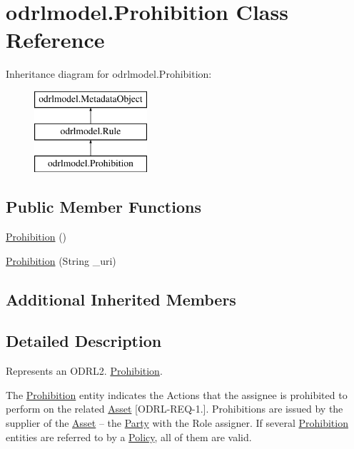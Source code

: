 \hypertarget{classodrlmodel_1_1_prohibition}{\section{odrlmodel.\-Prohibition Class Reference}
\label{classodrlmodel_1_1_prohibition}
}
Inheritance diagram for odrlmodel.\-Prohibition\-:\begin{figure}[H]
\begin{center}
\leavevmode
\includegraphics[height=3.000000cm]{classodrlmodel_1_1_prohibition}
\end{center}
\end{figure}
\subsection*{Public Member Functions}
\begin{DoxyCompactItemize}
\item 
\hyperlink{classodrlmodel_1_1_prohibition_a444002a7ca9513c35688bac18f176b0a}{Prohibition} ()
\item 
\hyperlink{classodrlmodel_1_1_prohibition_aa76b9833e97cd020ef8bf27469b39da6}{Prohibition} (String \-\_\-uri)
\end{DoxyCompactItemize}
\subsection*{Additional Inherited Members}


\subsection{Detailed Description}
Represents an O\-D\-R\-L2. \hyperlink{classodrlmodel_1_1_prohibition}{Prohibition}.

The \hyperlink{classodrlmodel_1_1_prohibition}{Prohibition} entity indicates the Actions that the assignee is prohibited to perform on the related \hyperlink{classodrlmodel_1_1_asset}{Asset} \mbox{[}O\-D\-R\-L-\/\-R\-E\-Q-\/1.\mbox{]}. Prohibitions are issued by the supplier of the \hyperlink{classodrlmodel_1_1_asset}{Asset} – the \hyperlink{classodrlmodel_1_1_party}{Party} with the Role assigner. If several \hyperlink{classodrlmodel_1_1_prohibition}{Prohibition} entities are referred to by a \hyperlink{classodrlmodel_1_1_policy}{Policy}, all of them are valid.

